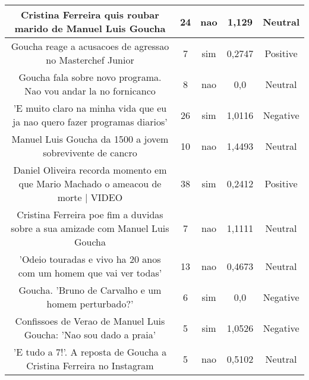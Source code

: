 \documentclass[11pt]{article}
\newlength\mylength
\begin{document}
\begin{center}
\begin{longtable}{||C{.40\mylength}||C{.20\mylength}||C{.20\mylength}||C{.30\mylength}||C{.20\mylength}||}
   Cristina Ferreira quis roubar marido de Manuel Luis Goucha  & 24 & nao & 1,129 & Neutral \\  \hline
   Goucha reage a acusacoes de agressao no Masterchef Junior  & 7 & sim & 0,2747 & Positive \\  \hline
   Goucha fala sobre novo programa. Nao vou andar la no fornicanco  & 8 & nao & 0,0 & Neutral \\  \hline
   'E muito claro na minha vida que eu ja nao quero fazer programas diarios'  & 26 & sim & 1,0116 & Negative \\  \hline
   Manuel Luis Goucha da 1500 a jovem sobrevivente de cancro  & 10 & nao & 1,4493 & Neutral \\  \hline
   Daniel Oliveira recorda momento em que Mario Machado o ameacou de morte | VIDEO  & 38 & sim & 0,2412 & Positive \\  \hline
   Cristina Ferreira poe fim a duvidas sobre a sua amizade com Manuel Luis Goucha  & 7 & nao & 1,1111 & Neutral \\  \hline
   'Odeio touradas e vivo ha 20 anos com um homem que vai ver todas'  & 13 & nao & 0,4673 & Neutral \\  \hline
   Goucha. 'Bruno de Carvalho e um homem perturbado?' & 6 & sim & 0,0 & Negative \\  \hline
   Confissoes de Verao de Manuel Luis Goucha: 'Nao sou dado a praia'  & 5 & sim & 1,0526 & Negative \\  \hline
   'E tudo a 7!'. A reposta de Goucha a Cristina Ferreira no Instagram  & 5 & nao & 0,5102 & Neutral \\  \hline

\end{longtable}
\end{center}
\end{document}
